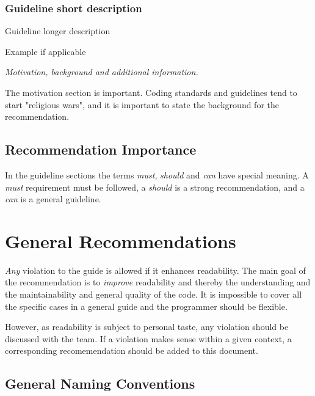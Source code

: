 \documentclass[a4paper,11pt,oneside]{scrbook}
\newcommand{\guideline}[1]{{\subsection{#1}}}
\newcommand{\motivation}[1]{{\normalfont \itshape #1}}
\begin{document}
\guideline{Guideline short description}

Guideline longer description

\begin{code}
  Example if applicable
\end{code}
   
\motivation{
  Motivation, background and additional information.
}

The motivation section is important. Coding standards and guidelines
tend to start "religious wars", and it is important to state the
background for the recommendation.

\section{Recommendation Importance}

In the guideline sections the terms \emph{must}, \emph{should} and \emph{can}
have special meaning. A \emph{must} requirement must be followed, a
\emph{should} is a strong recommendation, and a \emph{can} is a general
guideline.

\chapter{General Recommendations}

\emph{Any} violation to the guide is allowed if it enhances readability.  The
main goal of the recommendation is to \emph{improve} readability and thereby the
understanding and the maintainability and general quality of the code. It is
impossible to cover all the specific cases in a general guide and the programmer
should be flexible.

However, as readability is subject to personal taste, any violation should be
discussed with the team. If a violation makes sense within a given context, a
corresponding recomemendation should be added to this document.

\section{General Naming Conventions}
\label{sec:general-naming-conventions}
\end{document}
